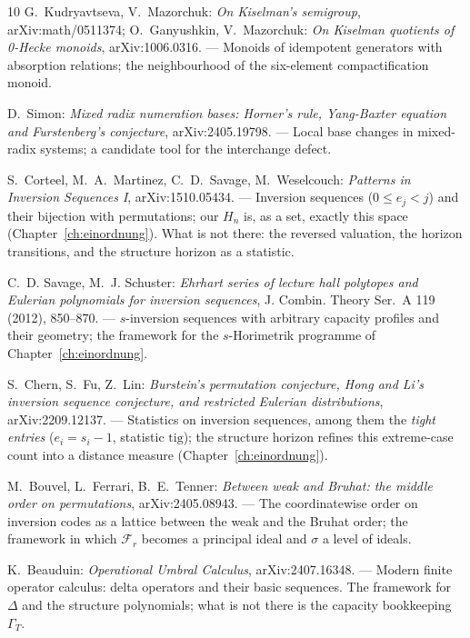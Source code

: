 \begin{thebibliography}{10}
 G.~Kudryavtseva, V.~Mazorchuk: \emph{On Kiselman's
semigroup}, arXiv:math/0511374; O.~Ganyushkin, V.~Mazorchuk:
\emph{On Kiselman quotients of 0-Hecke monoids}, arXiv:1006.0316.
--- Monoids of idempotent generators with absorption relations;
the neighbourhood of the six-element compactification monoid.

 D.~Simon: \emph{Mixed radix numeration bases:
Horner's rule, Yang-Baxter equation and Furstenberg's conjecture},
arXiv:2405.19798.
--- Local base changes in mixed-radix systems; a candidate tool
for the interchange defect.

 S.~Corteel, M.~A.~Martinez, C.~D.~Savage,
M.~Weselcouch: \emph{Patterns in Inversion Sequences I},
arXiv:1510.05434.
--- Inversion sequences ($0\le e_j<j$) and their bijection with
permutations; our $H_n$ is, as a set, exactly this space
(Chapter~\ref{ch:einordnung}). What is not there: the reversed
valuation, the horizon transitions, and the structure horizon as a
statistic.

 C.~D. Savage, M.~J. Schuster: \emph{Ehrhart
series of lecture hall polytopes and Eulerian polynomials for
inversion sequences}, J. Combin. Theory Ser.~A 119 (2012),
850--870.
--- $s$-inversion sequences with arbitrary capacity profiles and
their geometry; the framework for the $s$-Horimetrik programme of
Chapter~\ref{ch:einordnung}.

 S.~Chern, S.~Fu, Z.~Lin: \emph{Burstein's
permutation conjecture, Hong and Li's inversion sequence
conjecture, and restricted Eulerian distributions},
arXiv:2209.12137.
--- Statistics on inversion sequences, among them the \emph{tight
entries} ($e_i=s_i-1$, statistic $\mathrm{tig}$); the structure
horizon refines this extreme-case count into a distance measure
(Chapter~\ref{ch:einordnung}).

 M.~Bouvel, L.~Ferrari, B.~E.~Tenner:
\emph{Between weak and Bruhat: the middle order on permutations},
arXiv:2405.08943.
--- The coordinatewise order on inversion codes as a lattice
between the weak and the Bruhat order; the framework in which
$\mathcal F_r$ becomes a principal ideal and $\sigma$ a level of
ideals.

 K.~Beauduin: \emph{Operational Umbral Calculus},
arXiv:2407.16348.
--- Modern finite operator calculus: delta operators and their
basic sequences. The framework for $\Delta$ and the structure
polynomials; what is not there is the capacity bookkeeping
$\Gamma_T$.


\end{thebibliography}
